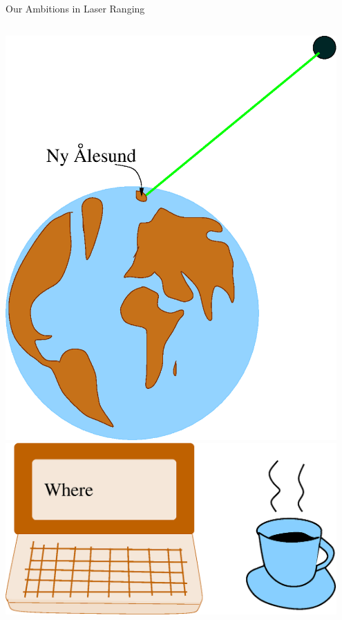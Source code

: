 \documentclass[12pt]{beamer}
\begin{document}
\begin{frame}{Our Ambitions in Laser Ranging}
  \vspace{0.7cm}
  \begin{columns}
      \includegraphics[width=0.95\textwidth]{figure/jordklode.eps}
      \includegraphics[width=0.95\textwidth]{figure/where.eps}
  \end{columns}
\end{frame}
\end{document}
